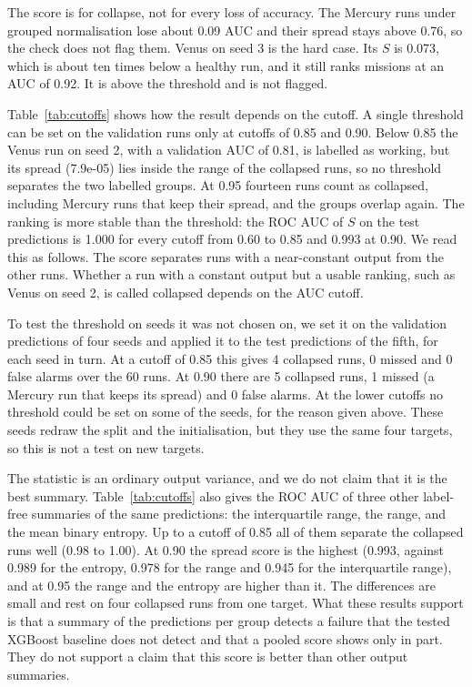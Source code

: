 \documentclass[preprint,12pt,authoryear]{elsarticle}
\begin{document}
The score is for collapse, not for every loss of accuracy. The Mercury runs under grouped normalisation lose about 0.09 AUC and their spread stays above 0.76, so the check does not flag them. Venus on seed 3 is the hard case. Its $S$ is 0.073, which is about ten times below a healthy run, and it still ranks missions at an AUC of 0.92. It is above the threshold and is not flagged.

Table~\ref{tab:cutoffs} shows how the result depends on the cutoff. A single threshold can be set on the validation runs only at cutoffs of 0.85 and 0.90. Below 0.85 the Venus run on seed 2, with a validation AUC of 0.81, is labelled as working, but its spread (7.9e-05) lies inside the range of the collapsed runs, so no threshold separates the two labelled groups. At 0.95 fourteen runs count as collapsed, including Mercury runs that keep their spread, and the groups overlap again. The ranking is more stable than the threshold: the ROC AUC of $S$ on the test predictions is 1.000 for every cutoff from 0.60 to 0.85 and 0.993 at 0.90. We read this as follows. The score separates runs with a near-constant output from the other runs. Whether a run with a constant output but a usable ranking, such as Venus on seed 2, is called collapsed depends on the AUC cutoff.

To test the threshold on seeds it was not chosen on, we set it on the validation predictions of four seeds and applied it to the test predictions of the fifth, for each seed in turn. At a cutoff of 0.85 this gives 4 collapsed runs, 0 missed and 0 false alarms over the 60 runs. At 0.90 there are 5 collapsed runs, 1 missed (a Mercury run that keeps its spread) and 0 false alarms. At the lower cutoffs no threshold could be set on some of the seeds, for the reason given above. These seeds redraw the split and the initialisation, but they use the same four targets, so this is not a test on new targets.

The statistic is an ordinary output variance, and we do not claim that it is the best summary. Table~\ref{tab:cutoffs} also gives the ROC AUC of three other label-free summaries of the same predictions: the interquartile range, the range, and the mean binary entropy. Up to a cutoff of 0.85 all of them separate the collapsed runs well (0.98 to 1.00). At 0.90 the spread score is the highest (0.993, against 0.989 for the entropy, 0.978 for the range and 0.945 for the interquartile range), and at 0.95 the range and the entropy are higher than it. The differences are small and rest on four collapsed runs from one target. What these results support is that a summary of the predictions per group detects a failure that the tested XGBoost baseline does not detect and that a pooled score shows only in part. They do not support a claim that this score is better than other output summaries.
\end{document}
